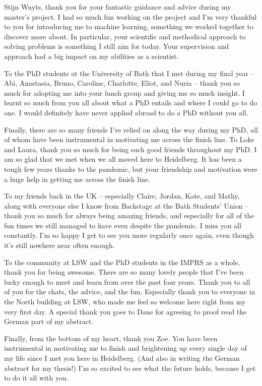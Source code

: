 Stijn Wuyts, thank you for your fantastic guidance and advice during my master's project. I had so much fun working on the project and I'm very thankful to you for introducing me to machine learning, something we worked together to discover more about. In particular, your scientific and methodical approach to solving problems is something I still aim for today. Your supervision and approach had a big impact on my abilities as a scientist.

To the PhD students at the University of Bath that I met during my final year -- Abi, Anastasia, Bruno, Caroline, Charlotte, Eliot, and Nuria -- thank you so much for adopting me into your lunch group and giving me so much insight. I learnt so much from you all about what a PhD entails and where I could go to do one. I would definitely have never applied abroad to do a PhD without you all.

Finally, there are so many friends I've relied on along the way during my PhD, all of whom have been instrumental in motivating me across the finish line. To Loke and Laura, thank you so much for being such good friends throughout my PhD. I am so glad that we met when we all moved here to Heidelberg. It has been a tough few years thanks to the pandemic, but your friendship and motivation were a huge help in getting me across the finish line.

To my friends back in the UK -- especially Claire, Jordan, Kate, and Mathy, along with everyone else I know from Backstage at the Bath Students' Union -- thank you so much for always being amazing friends, and especially for all of the fun times we still managed to have even despite the pandemic. I miss you all constantly. I'm so happy I get to see you more regularly once again, even though it's still nowhere near often enough.

To the community at LSW and the PhD students in the IMPRS as a whole, thank you for being awesome. There are so many lovely people that I've been lucky enough to meet and learn from over the past four years. Thank you to all of you for the chats, the advice, and the fun. Especially thank you to everyone in the North building at LSW, who made me feel so welcome here right from my very first day. A special thank you goes to Dane for agreeing to proof read the German part of my abstract.

Finally, from the bottom of my heart, thank you Zoe. You have been instrumental in motivating me to finish and brightening up every single day of my life since I met you here in Heidelberg. (And also in writing the German abstract for my thesis!) I'm so excited to see what the future holds, because I get to do it all with you.
